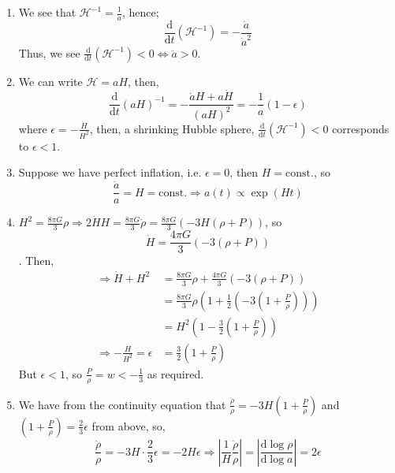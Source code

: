 \begin{enumerate}
\item We see that $\mathcal{H}^{-1} = \frac{1}{\dot{a}}$, hence;
$$\frac{\textrm{d}}{\textrm{d}t}\left(\mathcal{H}^{-1}\right) = -\frac{\ddot{a}}{\dot{a}^2}$$
\noindent Thus, we see $\frac{\textrm{d}}{\textrm{d}t}\left(\mathcal{H}^{-1}\right) < 0 \iff \ddot{a} > 0$.
\item We can write $\mathcal{H} = aH$, then,
$$\frac{\textrm{d}}{\textrm{d}t}\left(aH\right)^{-1}=-\frac{\dot{a}H + a\dot{H}}{(aH)^2}=-\frac{1}{a}(1-\epsilon)$$
where $\epsilon = -\frac{\dot{H}}{H^2}$, then, a shrinking Hubble sphere, $\frac{\textrm{d}}{\textrm{d}t}\left(\mathcal{H}^{-1}\right) < 0$ corresponds to $\epsilon < 1$.
\item Suppose we have perfect inflation, i.e. $\epsilon = 0$, then $H = \textrm{const.}$, so
$$\frac{\dot{a}}{a} = H = \textrm{const.} \Rightarrow a(t) \propto \exp(Ht)$$
\item $H^2 = \frac{8\pi G}{3}\rho \Rightarrow 2\dot{H}H = \frac{8\pi G}{3}\dot{\rho} = \frac{8\pi G}{3}\left(-3H(\rho + P)\right)$, so $$\dot{H} = \frac{4\pi G}{3}\left(-3(\rho + P)\right)$$. Then,
\begin{align*}
\Rightarrow \dot{H} + H^2 &=\frac{8\pi G}{3}\rho + \frac{4 \pi G}{3}\left(-3(\rho + P)\right) \\
&= \frac{8\pi G}{3}\rho \left(1 + \frac{1}{2}\left(-3\left(1 + \frac{P}{\rho}\right)\right)\right) \\
&= H^2\left(1-\frac{3}{2}\left(1+\frac{P}{\rho}\right)\right) \\
\Rightarrow -\frac{\dot{H}}{H^2}=\epsilon &= \frac{3}{2}\left(1+\frac{P}{\rho}\right)
\end{align*}
But $\epsilon < 1$, so $\frac{P}{\rho} = w < -\frac{1}{3}$ as required.
\item We have from the continuity equation that $\frac{\dot{\rho}}{\rho} = -3H\left(1 + \frac{P}{\rho}\right)$ and $\left(1+\frac{P}{\rho}\right) = \frac{2}{3}\epsilon$ from above, so,
$$\frac{\dot{\rho}}{\rho}= -3H\cdot \frac{2}{3}\epsilon = -2H \epsilon \Rightarrow \left|\frac{1}{H}\frac{\dot{\rho}}{\rho}\right| = \left|\frac{\textrm{d}\log \rho}{\textrm{d}\log a}\right| = 2\epsilon$$
\end{enumerate}
